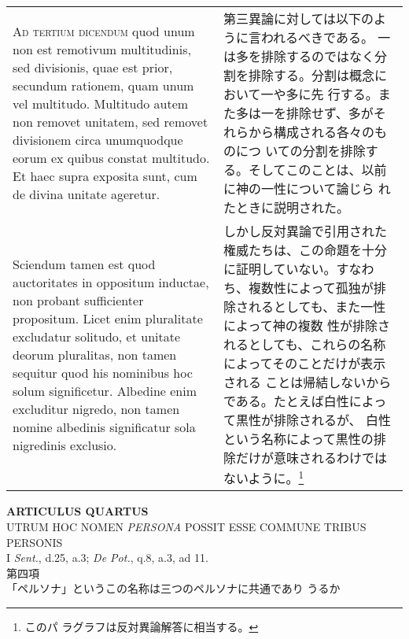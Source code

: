 \documentclass[10pt]{jsarticle} %
\begin{document}
\begin{longtable}{p{21em}p{21em}}
{\scshape Ad tertium dicendum} quod unum non est remotivum multitudinis, sed
divisionis, quae est prior, secundum rationem, quam unum vel
multitudo. Multitudo autem non removet unitatem, sed removet
divisionem circa unumquodque eorum ex quibus constat multitudo. Et
haec supra exposita sunt, cum de divina unitate ageretur. 

&

第三異論に対しては以下のように言われるべきである。
一は多を排除するのではなく分割を排除する。分割は概念において一や多に先
 行する。また多は一を排除せず、多がそれらから構成される各々のものにつ
 いての分割を排除する。そしてこのことは、以前に神の一性について論じら
 れたときに説明された。


\\

Sciendum
tamen est quod auctoritates in oppositum inductae, non probant
sufficienter propositum. Licet enim pluralitate excludatur solitudo,
et unitate deorum pluralitas, non tamen sequitur quod his nominibus
hoc solum significetur. Albedine enim excluditur nigredo, non tamen
nomine albedinis significatur sola nigredinis exclusio.

&

しかし反対異論で引用された権威たちは、この命題を十分に証明していない。すなわ
 ち、複数性によって孤独が排除されるとしても、また一性によって神の複数
 性が排除されるとしても、これらの名称によってそのことだけが表示される
 ことは帰結しないからである。たとえば白性によって黒性が排除されるが、
 白性という名称によって黒性の排除だけが意味されるわけではないように。\footnote{このパ
 ラグラフは反対異論解答に相当する。}



\end{longtable}
\newpage





\begin{center}
{\Large {\bf ARTICULUS QUARTUS}}\\
{\large UTRUM HOC NOMEN {\itshape PERSONA} POSSIT ESSE COMMUNE TRIBUS PERSONIS}\\
{\footnotesize I {\itshape Sent.}, d.25, a.3; {\itshape De Pot.}, q.8,
 a.3, ad 11.}\\
{\Large 第四項\\「ペルソナ」というこの名称は三つのペルソナに共通であり
 うるか}
\end{center}
\end{document}
